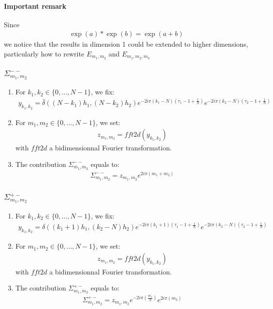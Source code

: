 \paragraph{Important remark\\}
Since
\begin{align*}
  \exp(a) * \exp(b) = \exp(a+b)
\end{align*}
we notice that the results in dimension 1 could be extended to higher dimensions, particularly how to rewrite $E_{m_1,m_2}$ and $E_{m_1,m_2,m_3}$

\subsubsection{$\Sigma_{m_1,m_2}^{--}$}

\begin{enumerate}
\item For $k_1,k_2\in\{0,\hdots,N-1\}$, we fix:
\begin{align*}
y_{k_1,k_2}=\bar{\delta}((N-k_1)h_1,(N-k_2)h_2)e^{-2i\pi (k_1-N)\left(\tau_1-1+\frac{1}{N}\right)}e^{-2i\pi (k_2-N)\left(\tau_2-1+\frac{1}{N}\right)}
\end{align*}
\item For $m_1,m_2\in\{0,\hdots,N-1\}$, we set:
\begin{align*}
  z_{m_1,m_2}=fft2d(y_{k_1,k_2})
\end{align*}
with $fft2d$ a bidimensionnal Fourier transformation.
\item The contribution $\Sigma_{m_1,m_2}^{--}$ equals to:
\begin{align*}
  \Sigma_{m_1,m_2}^{--}=z_{m_1,m_2}e^{2i\pi\left(m_1+m_2\right)}
\end{align*}
\end{enumerate}

\subsubsection{$\Sigma_{m_1,m_2}^{+-}$}

\begin{enumerate}
\item For $k_1,k_2\in\{0,\hdots,N-1\}$, we fix:
\begin{align*}
y_{k_1,k_2}= \delta((k_1+1)h_1,(k_2-N)h_2)e^{-2i\pi (k_1+1)\left(\tau_1-1+\frac{1}{N}\right)}e^{-2i\pi (k_2-N)\left(\tau_2-1+\frac{1}{N}\right)}
\end{align*}
\item For $m_1,m_2\in\{0,\hdots,N-1\}$, we set:
\begin{align*}
  z_{m_1,m_2}=fft2d(y_{k_1,k_2})
\end{align*}
with $fft2d$ a bidimensionnal Fourier transformation.
\item The contribution $\Sigma_{m_1,m_2}^{+-}$ equals to:
\begin{align*}
  \Sigma_{m_1,m_2}^{+-}=z_{m_1,m_2}e^{-2i\pi\left(\frac{m_1}{N}\right)} e^{2i\pi\left(m_2\right)}
\end{align*}
\end{enumerate}


